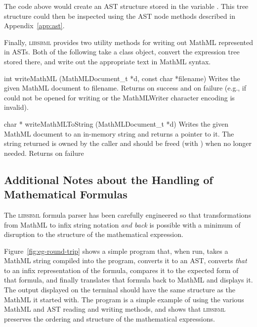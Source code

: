 \documentclass{sbmlmanual}
\newcommand{\libsbml}{\textsc{libsbml}}
\begin{document}
The code above would create an AST structure stored in the variable
.  This tree structure could then be inspected using the AST node
methods described in Appendix~\ref{app:ast}.

Finally, \libsbml{} provides two utility methods for writing out MathML
represented in ASTs.  Both of the following take a
 class object, convert the expression tree stored
there, and write out the appropriate text in MathML syntax.


\begin{methoddef}{int writeMathML (MathMLDocument\_t *d, const char *filename)}
  Writes the given MathML document to filename.  Returns  on
  success and  on failure (e.g., if  could not
  be opened for writing or the MathMLWriter character encoding is invalid).
\end{methoddef}


\begin{methoddef}{char * writeMathMLToString (MathMLDocument\_t *d)}
  Writes the given MathML document to an in-memory string and returns a
  pointer to it.  The string returned is owned by the caller and should be
  freed (with ) when no longer needed.  Returns  on
  failure
\end{methoddef}



\subsection{Additional Notes about the Handling of Mathematical Formulas}
\label{sec:mathml-special-cases}

The \libsbml{} formula parser has been carefully engineered so that
transformations from MathML to infix string notation \emph{and back} is
possible with a minimum of disruption to the structure of the mathematical
expression.

Figure~\vref{fig:eg-round-trip} shows a simple program that, when run,
takes a MathML string compiled into the program, converts it to an AST,
converts \emph{that} to an infix representation of the formula, compares it
to the expected form of that formula, and finally translates that formula
back to MathML and displays it.  The output displayed on the terminal
should have the same structure as the MathML it started with.  The program
is a simple example of using the various MathML and AST reading and writing
methods, and shows that \libsbml{} preserves the ordering and structure of
the mathematical expressions.
\end{document}
